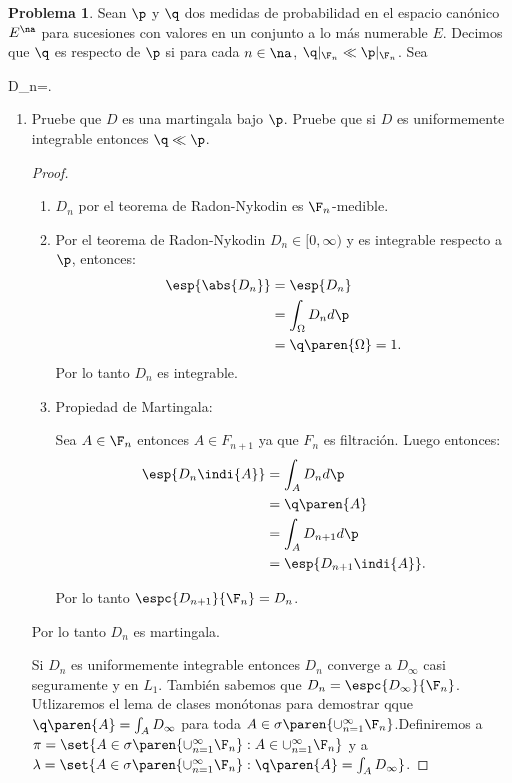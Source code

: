 \documentclass[a5paper,oneside]{amsart}
\theoremstyle{plain}
\theoremstyle{definition}
\newtheorem{problema}{Problema}
\begin{document}
\begin{problema}
Sean $\p$ y $\q$ dos medidas de probabilidad en el espacio can\'onico $E^\na$ para sucesiones con valores en un conjunto a lo m\'as numerable $E$. Decimos que $\q$ es  respecto de $\p$ si para cada $n\in\na$, $\q|_{\F_n}\ll\p|_{\F_n}$. Sea\begin{esn}
D_n=.
\end{esn}
\begin{enumerate}
\item Pruebe que $D$ es una martingala bajo $\p$. Pruebe que si $D$ es uniformemente integrable entonces $\q\ll\p$. 
\begin{proof}
\begin{enumerate}
\item $D_n$  por el teorema de Radon-Nykodin es $\F_n$-medible.
\item Por el teorema de Radon-Nykodin $D_n\in [0,\infty)$ y es integrable respecto a $\p$, entonces:
\begin{align}
\esp{\abs{D_n}}&=\esp{D_n} \notag \\
&=\int_{\Omega}D_n d\p\notag \\
&=\q \paren{\Omega}=1. \notag
\end{align}
Por lo tanto $D_n$ es integrable.
\item Propiedad de Martingala:

Sea $A\in \F_n$ entonces $A\in F_{n+1}$ ya que $F_n$ es filtraci\'on. Luego entonces:
\begin{align}
\esp{D_n\indi{A}}&= \int_{A} D_n d\p \notag \\
&=\q\paren{A}\notag \\
&=\int_{A} D_{n+1} d\p \notag \\
&=\esp{D_{n+1}\indi{A}}. \notag
\end{align}

Por lo tanto $\espc{D_{n+1}}{\F_n}=D_n$.
\end{enumerate}

Por lo tanto $D_n$ es martingala.

Si $D_n$ es uniformemente integrable entonces $D_n$ converge a $D_\infty$ casi seguramente y en $L_1$. Tambi\'en sabemos que $D_n =\espc{D_\infty}{\F_n}$. Utlizaremos el lema de clases mon\'otonas para demostrar qque $\q\paren{A}=\int_{A}D_{\infty}$ para toda $A\in\sigma\paren{\cup_{n=1}^{\infty}\F_n}$.Definiremos a  $\pi=\set{A\in\sigma\paren{\cup_{n=1}^{\infty}\F_n} :A\in \cup_{n=1}^{\infty}\F_n}$ y a $\lambda=\set{A\in\sigma\paren{\cup_{n=1}^{\infty}\F_n}: \q\paren{A}=\int_{A}D_{\infty} }$.


\end{proof}
\end{enumerate}
\end{problema}
\end{document}
